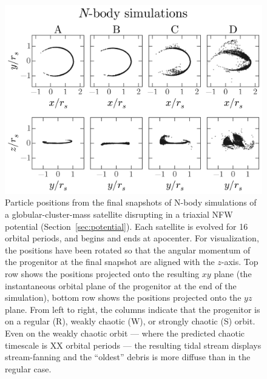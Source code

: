 \documentclass[letterpaper,12pt,preprint]{aastex}
\begin{document}
\begin{figure}[p]
\begin{center}
\includegraphics[width=\textwidth]{figures/nbody.png}
\caption{Particle positions from the final snapshots of N-body simulations of a globular-cluster-mass satellite disrupting in a triaxial NFW potential (Section~\ref{sec:potential}). Each satellite is evolved for 16 orbital periods, and begins and ends at apocenter. For visualization, the positions have been rotated so that the angular momentum of the progenitor at the final snapshot are aligned with the $z$-axis. Top row shows the positions projected onto the resulting $xy$ plane (the instantaneous orbital plane of the progenitor at the end of the simulation), bottom row shows the positions projected onto the $yz$ plane. From left to right, the columns indicate that the progenitor is on a regular (R), weakly chaotic (W), or strongly chaotic (S) orbit. Even on the weakly chaotic orbit --- where the predicted chaotic timescale is XX orbital periods --- the resulting tidal stream displays stream-fanning and the ``oldest'' debris is more diffuse than in the regular case.} \label{fig:nbodysims}
\end{center}
\end{figure}
\end{document}
